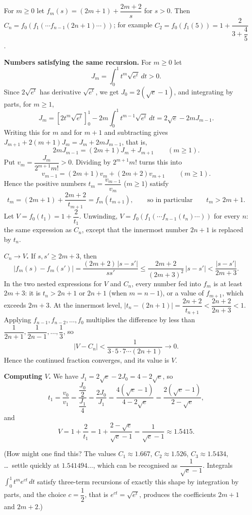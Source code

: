For $m\ge0$ let $f_m(s)=(2m+1)+\dfrac{2m+2}{s}$ for $s>0$. Then $C_n=f_0\left(f_1\left(\cdots f_{n-1}(2n+1)\cdots\right)\right)$; for example $C_2=f_0\left(f_1(5)\right)=1+\dfrac{2}{3+\dfrac45}$.

\textbf{Numbers satisfying the same recursion.} For $m\ge0$ let
\[J_m=\int_0^1t^m\sqrt{e^t}\,dt>0.\]
Since $2\sqrt{e^t}$ has derivative $\sqrt{e^t}$, we get $J_0=2\left(\sqrt e-1\right)$, and integrating by parts, for $m\ge1$,
\[J_m=\left[2t^m\sqrt{e^t}\right]_0^1-2m\int_0^1t^{m-1}\sqrt{e^t}\,dt=2\sqrt e-2mJ_{m-1}.\]
Writing this for $m$ and for $m+1$ and subtracting gives $J_{m+1}+2(m+1)J_m=J_m+2mJ_{m-1}$, that is,
\[2mJ_{m-1}=(2m+1)J_m+J_{m+1}\qquad(m\ge1).\]
Put $v_m=\dfrac{J_m}{2^{m+1}m!}>0$. Dividing by $2^{m+1}m!$ turns this into
\[v_{m-1}=(2m+1)v_m+(2m+2)v_{m+1}\qquad(m\ge1).\]
Hence the positive numbers $t_m=\dfrac{v_{m-1}}{v_m}$ ($m\ge1$) satisfy
\[t_m=(2m+1)+\dfrac{2m+2}{t_{m+1}}=f_m(t_{m+1}),\qquad\text{so in particular}\qquad t_m>2m+1.\]
Let $V=f_0(t_1)=1+\dfrac{2}{t_1}$. Unwinding, $V=f_0\left(f_1\left(\cdots f_{n-1}(t_n)\cdots\right)\right)$ for every $n$: the same expression as $C_n$, except that the innermost number $2n+1$ is replaced by $t_n$.

\textbf{$C_n\to V$.} If $s,s'\ge2m+3$, then
\[\left|f_m(s)-f_m(s')\right|=\dfrac{(2m+2)\,|s-s'|}{ss'}\le\dfrac{2m+2}{(2m+3)^2}\,|s-s'|<\dfrac{|s-s'|}{2m+3}.\]
In the two nested expressions for $V$ and $C_n$, every number fed into $f_m$ is at least $2m+3$: it is $t_n>2n+1$ or $2n+1$ (when $m=n-1$), or a value of $f_{m+1}$, which exceeds $2m+3$. At the innermost level, $\left|t_n-(2n+1)\right|=\dfrac{2n+2}{t_{n+1}}<\dfrac{2n+2}{2n+3}<1$. Applying $f_{n-1},f_{n-2},\dots,f_0$ multiplies the difference by less than $\dfrac1{2n+1},\dfrac1{2n-1},\dots,\dfrac13$, so
\[|V-C_n|<\dfrac{1}{3\cdot5\cdot7\cdots(2n+1)}\longrightarrow0.\]
Hence the continued fraction converges, and its value is $V$.

\textbf{Computing $V$.} We have $J_1=2\sqrt e-2J_0=4-2\sqrt e$, so
\[t_1=\dfrac{v_0}{v_1}=\dfrac{\dfrac{J_0}{2}}{\dfrac{J_1}{4}}=\dfrac{2J_0}{J_1}=\dfrac{4\left(\sqrt e-1\right)}{4-2\sqrt e}=\dfrac{2\left(\sqrt e-1\right)}{2-\sqrt e},\]
and
\[V=1+\dfrac{2}{t_1}=1+\dfrac{2-\sqrt e}{\sqrt e-1}=\boxed{\dfrac{1}{\sqrt e-1}}\approx1.5415.\]

(How might one find this? The values $C_1\approx1.667$, $C_2\approx1.526$, $C_3\approx1.5434$, \dots\ settle quickly at $1.541494\dots$, which can be recognised as $\dfrac{1}{\sqrt e-1}$. Integrals $\int_0^1t^me^{ct}\,dt$ satisfy three-term recursions of exactly this shape by integration by parts, and the choice $c=\dfrac12$, that is $e^{ct}=\sqrt{e^t}$, produces the coefficients $2m+1$ and $2m+2$.)
